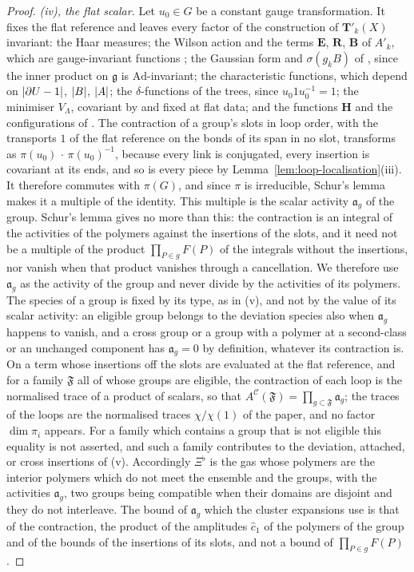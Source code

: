 \documentclass[11pt]{preprint}
\DeclarePairedDelimiter{\abs}{\lvert}{\rvert}
\numberwithin{equation}{section}
\theoremstyle{definition}
\theoremstyle{remark}
\theoremstyle{plain}
\begin{document}
\begin{proof}
\emph{(iv), the flat scalar.} Let $u_0 \in G$ be a constant gauge transformation. It fixes the flat reference and leaves every factor of the construction of $\mathbf T'_k(X)$ invariant: the Haar measures; the Wilson action and the terms $\mathbf E$, $\mathbf R$, $\mathbf B$ of $A'_k$, which are gauge-invariant functions \cite[(2.23), p.~258; (2.30), p.~260]{BalabanCRE}; the Gaussian form and $\sigma(g_kB)$ of \cite[(1.70)]{BalabanLFR2}, since the inner product on $\mathfrak g$ is $\mathrm{Ad}$-invariant; the characteristic functions, which depend on $\abs{\partial U - 1}$, $\abs B$, $\abs A$; the $\delta$-functions of the trees, since $u_0 1 u_0^{-1} = 1$; the minimiser $V_\Lambda$, covariant by \cite[Proposition~1, p.~194]{BalabanLFR1} and fixed at flat data; and the functions $\mathbf H$ and the configurations of \cite[(1.61)--(1.63)]{BalabanLFR2}. The contraction of a group's slots in loop order, with the transports $1$ of the flat reference on the bonds of its span in no slot, transforms as $\pi(u_0)\,\cdot\,\pi(u_0)^{-1}$, because every link is conjugated, every insertion is covariant at its ends, and so is every piece by Lemma~\ref{lem:loop-localisation}(iii). It therefore commutes with $\pi(G)$, and since $\pi$ is irreducible, Schur's lemma makes it a multiple of the identity. This multiple is the scalar activity $\mathfrak a_g$ of the group. Schur's lemma gives no more than this: the contraction is an integral of the activities of the polymers against the insertions of the slots, and it need not be a multiple of the product $\prod_{P \in g}F(P)$ of the integrals without the insertions, nor vanish when that product vanishes through a cancellation. We therefore use $\mathfrak a_g$ as the activity of the group and never divide by the activities of its polymers. The species of a group is fixed by its type, as in (v), and not by the value of its scalar activity: an eligible group belongs to the deviation species also when $\mathfrak a_g$ happens to vanish, and a cross group or a group with a polymer at a second-class or an unchanged component has $\mathfrak a_g = 0$ by definition, whatever its contraction is. On a term whose insertions off the slots are evaluated at the flat reference, and for a family $\mathfrak F$ all of whose groups are eligible, the contraction of each loop is the normalised trace of a product of scalars, so that $A^{\mathcal C}(\mathfrak F) = \prod_{g \subset \mathfrak F}\mathfrak a_g$; the traces of the loops are the normalised traces $\chi/\chi(1)$ of the paper, and no factor $\dim\pi_i$ appears. For a family which contains a group that is not eligible this equality is not asserted, and such a family contributes to the deviation, attached, or cross insertions of (v). Accordingly $\Xi^\flat$ is the gas whose polymers are the interior polymers which do not meet the ensemble and the groups, with the activities $\mathfrak a_g$, two groups being compatible when their domains are disjoint and they do not interleave. The bound of $\mathfrak a_g$ which the cluster expansions use is that of the contraction, the product of the amplitudes $\hat c_1$ of the polymers of the group and of the bounds of the insertions of its slots, and not a bound of $\prod_{P \in g}F(P)$.


\end{proof}
\end{document}
